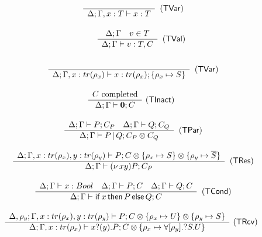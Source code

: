 \begin{figure}[H]
\centering

  \[
  \begin{array}{cc}
  \tree{
  \\
  }{
    \Delta; \Gamma , x: T \types x: T
  }{}{\TVar}
  \\ \\
  \qquad
  \tree{
  \Delta; \Gamma
  \andalso
    v \in T
  }{
    \Delta; \Gamma \types v: T, C
  }{}{\TVal}

  \\ \\
  \tree{
  \\
  }{
    \Delta; \Gamma , x: tr(\rho_x) \types x: tr(\rho_x); \{\rho_x \mapsto S\}
  }{}{\TVar}
  \\ \\
  \tree{
  C \text{ completed}
  }{
  \Delta; \Gamma \types \nil; C
  }{\TInact}
  \\ \\
  \tree{
  \Delta; \Gamma \types P; C_P
  \andalso
  \Delta; \Gamma \types Q; C_Q
  }{
    \Delta; \Gamma \types P \pll Q; C_P \otimes C_Q
  }{}{\TPar}
  \\ \\
   \tree{
     \Delta; \Gamma, x: tr(\rho_x), y: tr(\rho_y) \types P; C \otimes \{\rho_x \mapsto S\} \otimes \{\rho_y \mapsto \tdual S\}
   }{
     \Delta; \Gamma \types \newn{xy} P; C_P
   }{}{\TRes}
   \\ \\
    \tree{
      \Delta; \Gamma \types x: Bool \andalso \Delta; \Gamma \types P; C \andalso \Delta; \Gamma \types Q; C
    }{
      \Delta; \Gamma \types \cond{x}{P}{Q}; C
    }{}{\TCond}
    \\ \\
    \tree{
    \Delta, \rho_y; \Gamma, x : tr(\rho_x), y: tr(\rho_y) \types P; C \otimes \{\rho_x \mapsto U\} \otimes \{\rho_y \mapsto S\}
      }{
        \Delta; \Gamma, x: tr(\rho_x) \types \pin{x}{y} P; C \otimes \{\rho_x \mapsto \forall [\rho_y].\tin S U \}
      }{\TRcv}


\end{array}\]
\end{figure}
